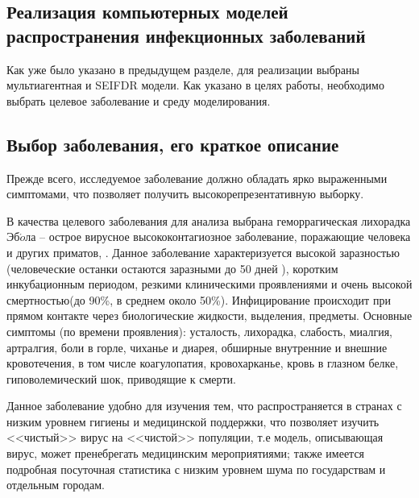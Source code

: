 \newpage
\parindent=1cm %
\begin{center}
		
		\section{Реализация компьютерных моделей распространения инфекционных заболеваний}
		
\end{center}


Как уже было указано  в предыдущем разделе, для реализации выбраны мультиагентная и SEIFDR модели. Как указано в целях работы, необходимо выбрать целевое заболевание и среду моделирования.

\subsection{Выбор заболевания, его краткое описание}
Прежде всего, исследуемое заболевание должно обладать ярко выраженными симптомами, что позволяет получить высокорепрезентативную  выборку.


В качества целевого заболевания для анализа выбрана геморрагическая лихорадка Эб$\acute{o}$ла -- острое вирусное высококонтагиозное заболевание, поражающие человека и других приматов, . Данное заболевание характеризуется высокой заразностью (человеческие останки остаются заразными до 50 дней 
), коротким инкубационным периодом, резкими клиническими проявлениями и очень высокой смертностью(до 90\%, в среднем около 50\%). %
Инфицирование происходит при прямом контакте через биологические жидкости, выделения, предметы. Основные симптомы (по времени проявления):  усталость, лихорадка, слабость, миалгия,  артралгия, боли в горле, чиханье и диарея,  обширные внутренние и внешние кровотечения, в том числе коагулопатия, кровохарканье, кровь в глазном белке, гиповолемический шок, приводящие к смерти. 

Данное заболевание удобно для изучения тем, что распространяется в странах с низким уровнем гигиены и медицинской поддержки, что позволяет изучить <<чистый>> вирус на <<чистой>> популяции, т.е модель, описывающая вирус, может пренебрегать медицинским мероприятиями; также имеется подробная посуточная статистика с низким уровнем шума по государствам и отдельным городам.


